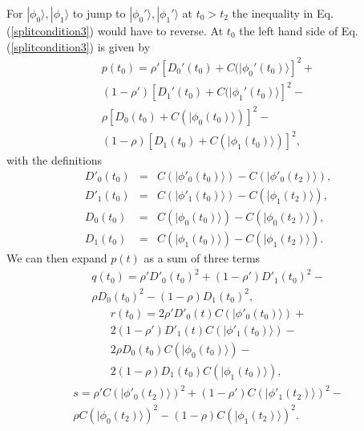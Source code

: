 \documentclass[12pt,amsmath,amssymb,onecolumn]{revtex4-2}
\begin{document}
For $|\phi_0 \rangle , |\phi_1 \rangle $
to jump to
$|\phi_0' \rangle , |\phi_1' \rangle $ at $t_0 > t_2$ the inequality in Eq. (\ref{splitcondition3})
would have to reverse.
At  $t_0$ the left hand side of Eq. (\ref{splitcondition3}) is given
by 
\begin{multline}
  \label{lefthand1}
  p(t_0) = \rho' [ D_0'( t_0) + C(|\phi_0'( t_0) \rangle ] ^2 + \\
(1-\rho') [ D_1'( t_0) + C(|\phi_1'( t_0) \rangle ] ^2 - \\
  \rho [D_0( t_0) + C( |\phi_0(t_0) \rangle )]^2 - \\
  (1-\rho) [D_1( t_0) + C( |\phi_1(t_0) \rangle )]^2,
\end{multline}
with the definitions
\begin{subequations}
  \begin{eqnarray}
 \label{defD0p}
    D'_0(t_0) & = &  C( |\phi'_0(t_0) \rangle ) - C(|\phi'_0(t_2) \rangle ) ,\\
 \label{defD1p}
    D'_1(t_0) & = &  C( |\phi'_1(t_0) \rangle ) - C(|\phi_1(t_2) \rangle ), \\
 \label{defD01}
    D_0(t_0) & = &  C( |\phi_0(t_0) \rangle ) - C(|\phi_0(t_2) \rangle ) ,\\
 \label{defD11}
    D_1(t_0) & = &  C( |\phi_1(t_0) \rangle ) - C(|\phi_1(t_2) \rangle ).
  \end{eqnarray}
\end{subequations}
We can then expand $p(t)$ as a sum of three terms
\begin{multline}
  \label{defq1}
  q( t_0) = \rho' D'_0(t_0)^2 + (1 - \rho') D'_1(t_0)^2 -\\
  \rho D_0(t_0)^2 - (1 - \rho) D_1(t_0)^2,
\end{multline}
\begin{multline}
  \label{defr1}
  r( t_0) = 2\rho' D'_0(t)C(|\phi'_0(t_0) \rangle ) + \\
  2 (1 - \rho') D'_1(t)C(|\phi'_1(t_0) \rangle ) - \\
  2\rho D_0(t_0)C(|\phi_0(t_0) \rangle ) - \\2 (1 - \rho) D_1(t_0)C(|\phi_1(t_0) \rangle ),
\end{multline}
\begin{multline}
  \label{defs1}
  s =  \rho' C(|\phi'_0(t_2) \rangle )^2 + (1 - \rho')C(|\phi'_1(t_2) \rangle )^2 - \\
  \rho C(|\phi_0(t_2) \rangle )^2 - (1 - \rho)C(|\phi_1(t_2) \rangle )^2.
\end{multline}
\end{document}
